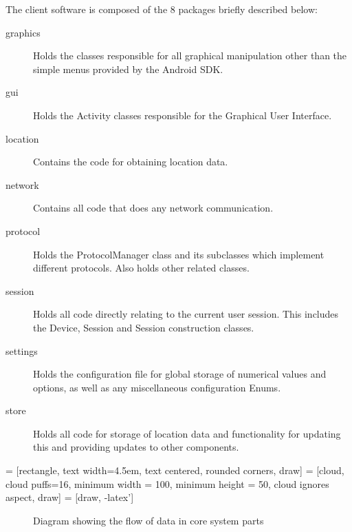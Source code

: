 The client software is composed of the 8 packages briefly described below:
\begin{description}
\item[graphics]{Holds the classes responsible for all graphical manipulation other than the simple menus provided by the Android SDK.}
\item[gui]{Holds the Activity classes responsible for the Graphical User Interface.}
\item[location]{Contains the code for obtaining location data.}
\item[network]{Contains all code that does any network communication.}
\item[protocol]{Holds the ProtocolManager class and its subclasses which implement different protocols. Also holds other related classes.}
\item[session]{Holds all code directly relating to the current user session. This includes the Device, Session and Session construction classes.}
\item[settings]{Holds the configuration file for global storage of numerical values and options, as well as any miscellaneous configuration Enums.}
\item[store]{Holds all code for storage of location data and functionality for updating this and providing updates to other components.}
\end{description}

 = [rectangle, text width=4.5em, text centered, rounded corners, draw]
 = [cloud, cloud puffs=16, minimum width = 100, minimum height = 50, cloud ignores aspect, draw]
 = [draw, -latex']
\begin{figure}[ht]
\centering
{}
\caption{Diagram showing the flow of data in core system parts}
\label{fig:dataflow}
\end{figure}

